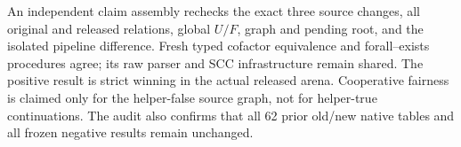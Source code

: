 An independent claim assembly rechecks the exact three source changes,
all original and released relations, global $U/F$, graph and pending
root, and the isolated pipeline difference. Fresh typed cofactor
equivalence and forall--exists procedures agree; its raw parser and
SCC infrastructure remain shared. The positive result is strict winning
in the actual released arena. Cooperative fairness is claimed only
for the helper-false source graph, not for helper-true continuations.
The audit also confirms that all 62 prior old/new native tables and
all frozen negative results remain unchanged.

